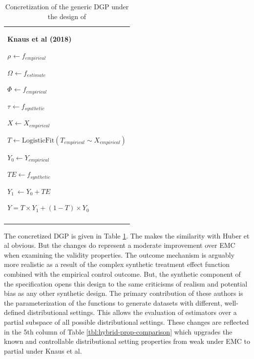 \documentclass[../main.tex]{subfiles}
\begin{document}
\begin{table}[H]
 			\centering
\begin{tabular}{p{3.14in}}
\hline
\multicolumn{1}{|p{3.14in}|}{\textbf{Knaus et al (2018)} \par  \(  \rho _{} \leftarrow f_{empirical}~ \)  \par  \(  \Omega _{} \leftarrow f_{estimate} \)  \par  \(  \Phi _{} \leftarrow f_{empirical} \)  \par  \(  \tau_{} \leftarrow f_{synthetic}~ \)  \par  \( X \leftarrow X_{empirical} \)  \par  \( T \leftarrow \text{LogisticFit} \left(  T_{empirical} \sim X_{empirical} \right)  \)  \par  \( Y_{0} \leftarrow Y_{empirical} \)  \par  \( TE \leftarrow f_{synthetic} \)  \par  \( Y_{1}~ \leftarrow Y_{0}+ TE \)  \par  \( Y = T \times Y_{1}+  \left( 1-T \right)  \times Y_{0} \)  \par } \\
\hhline{-}
\end{tabular}
\caption{Concretization of the generic DGP under the design of \cite{Knaus2018MachineEvidence}}
\label{tbl:knaus-hybrid}
\end{table}

The concretized DGP is given in Table \ref{tbl:knaus-hybrid}. The makes the similarity with Huber et al obvious. But the changes do represent a moderate improvement over EMC when examining the validity properties. The outcome mechanism is arguably more realistic as a result of the complex synthetic treatment effect function combined with the empirical control outcome. But, the synthetic component of the specification opens this design to the same criticisms of realism and potential bias as any other synthetic design. The primary contribution of these authors is the parameterization of the functions to generate datasets with different, well-defined distributional settings. This allows the evaluation of estimators over a partial subspace of all possible distributional settings. These changes are reflected in the 5th column of Table \ref{tbl:hybrid-prop-comparison} which upgrades the known and controllable distributional setting properties from weak under EMC to partial under Knaus et al.\par
\end{document}
